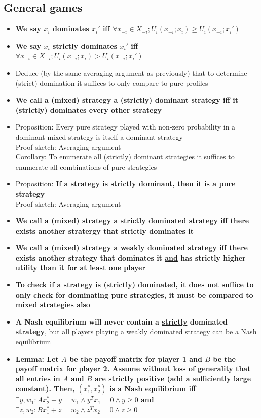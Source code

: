 \documentclass[20pt,a4paper,landscape]{extarticle}
\begin{document}
\begin{flushleft}
\subsection{General games}
\begin{itemize}
\item \textbf{We say \boldmath$x_i$ dominates \boldmath${x_i}'$ iff $\forall x_{-i} \in X_{-i}; U_i(x_{-i}; x_i) \geq U_i(x_{-i}; {x_i}')$}
\item \textbf{We say \boldmath$x_i$ strictly dominates \boldmath${x_i}'$ iff $\forall x_{-i} \in X_{-i}; U_i(x_{-i}; x_i) > U_i(x_{-i}; {x_i}')$}
\item Deduce (by the same averaging argument as previously) that to determine (strict) domination it suffices to only compare to pure profiles
\item \textbf{We call a (mixed) strategy a (strictly) dominant strategy iff it (strictly) dominates every other strategy}
\item Proposition: Every pure strategy played with non-zero probability in a dominant mixed strategy is itself a dominant strategy\\
Proof sketch: Averaging argument\\
Corollary: To enumerate all (strictly) dominant strategies it suffices to enumerate all combinations of pure strategies
\item Proposition: \textbf{If a strategy is strictly dominant, then it is a pure strategy}\\
Proof sketch: Averaging argument
\item \textbf{We call a (mixed) strategy a strictly dominated strategy iff there exists another stratergy that strictly dominates it}
\item \textbf{We call a (mixed) strategy a weakly dominated strategy iff there exists another strategy that dominates it \underline{and} has strictly higher utility than it for at least one player}
\item \textbf{To check if a strategy is (strictly) dominated, it does \underline{not} suffice to only check for dominating pure strategies, it must be compared to mixed strategies also}
\item \textbf{A Nash equilibrium will never contain a \underline{strictly} dominated strategy}, but all players playing a weakly dominated strategy can be a Nash equilibrium
\item \textbf{Lemma: Let \boldmath$A$ be the payoff matrix for player 1 and $B$ be the payoff matrix for player 2. Assume without loss of generality that all entries in $A$ and $B$ are strictly positive (add a sufficiently large constant). Then, $(x_1^\ast, x_2^\ast)$ is a Nash equilibrium iff $\exists y, w_1: Ax_2^\ast + y = w_1 \land y^Tx_1 = 0 \land y \geq 0$ and $\exists z, w_2: Bx_1^\ast + z = w_2 \land z^Tx_2 = 0 \land z \geq 0$}\\

\end{itemize}
\end{flushleft}
\end{document}
